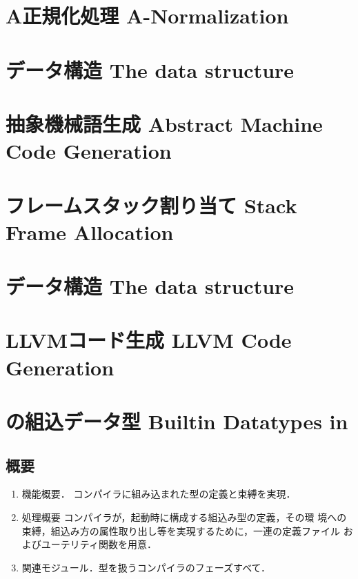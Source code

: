 \chapter{\txt
{A正規化処理}
{A-Normalization}
}
\label{chap:anormalization}

\chapter{\txt
{データ構造}
{The  data structure}
}
\label{chap:MachineCode}

\chapter{\txt
{抽象機械語生成}
{Abstract Machine Code Generation}
}
\label{chap:abstractcodegeneratrion}

\chapter{\txt
{フレームスタック割り当て}
{Stack Frame Allocation}
}
\label{chap:stackframeallocation}

\chapter{\txt
{データ構造}
{The  data structure}
}
\label{chap:LLVMIR}

\chapter{\txt
{LLVMコード生成}
{LLVM Code Generation}
}
\label{chap:LLVMCodegeneration}

\chapter{\txt
{\smlsharp{}の組込データ型}
{Builtin Datatypes in \smlsharp{}}
}
\label{chap:bootstraping}

\section{概要}
\begin{enumerate}
\item 機能概要．
	コンパイラに組み込まれた型の定義と束縛を実現．
\item 処理概要
	\smlsharp{}コンパイラが，起動時に構成する組込み型の定義，その環
境への束縛，組込み方の属性取り出し等を実現するために，一連の定義ファイル
およびユーテリティ関数を用意．
\item 関連モジュール．型を扱うコンパイラのフェーズすべて．

\end{enumerate}

